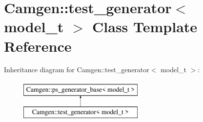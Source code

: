 \hypertarget{a00529}{\section{Camgen\-:\-:test\-\_\-generator$<$ model\-\_\-t $>$ Class Template Reference}
\label{a00529}
}
Inheritance diagram for Camgen\-:\-:test\-\_\-generator$<$ model\-\_\-t $>$\-:\begin{figure}[H]
\begin{center}
\leavevmode
\includegraphics[height=2.000000cm]{a00529}
\end{center}
\end{figure}
